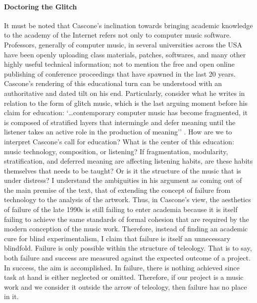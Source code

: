 \paragraph{Doctoring the Glitch}
It must be noted that Cascone's inclination towards bringing academic knowledge to the academy of the Internet refers not only to computer music software. Professors, generally of computer music, in several universities across the USA have been openly uploading class materials, patches, softwares, and many other highly useful technical information; not to mention the free and open online publishing of conference proceedings that have spawned in the last 20 years. Cascone's rendering of this educational turn can be understood with an authoritative and dated tilt on his end. Particularly, consider what he writes in relation to the form of glitch music, which is the last arguing moment before his claim for education: `\dots contemporary computer music has become fragmented, it is composed of stratified layers that intermingle and defer meaning until the listener takes an active role in the production of meaning'' \parencite[17]{Cas00:The}. How are we to interpret Cascone's call for education? What is the center of this education: music technology, composition, or listening? If fragmentation, modularity, stratification, and deferred meaning are affecting listening habits, are these habits themselves that needs to be taught? Or is it the structure of the music that is under distress? I understand the ambiguities in his argument as coming out of the main premise of the text, that of extending the concept of failure from technology to the analysis of the artwork. Thus, in Cascone's view, the aesthetics of failure of the late 1990s is still failing to enter academia because it is itself failing to achieve the same standards of formal cohesion that are required by the modern conception of the music work. Therefore, instead of finding an academic cure for blind experimentalism, I claim that failure is itself an unnecessary blindfold. Failure is only possible within the structure of teleology. That is to say, both failure and success are measured against the expected outcome of a project. In success, the aim is accomplished. In failure, there is nothing achieved since task at hand is either neglected or omitted. Therefore, if our project is a music work and we consider it outside the arrow of teleology, then failure has no place in it.  

